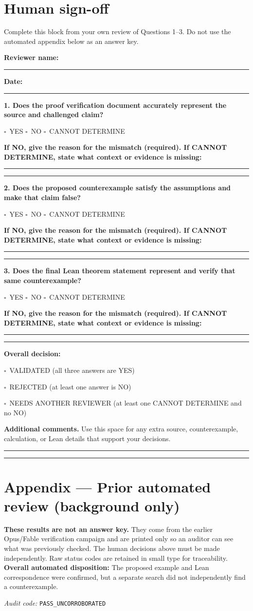 \documentclass[11pt]{article}
\newcommand{\checkbox}{$\square$}
\newcommand{\answerchoices}{\checkbox\ YES \quad \checkbox\ NO \quad \checkbox\ CANNOT DETERMINE}
\newcommand{\decisionexplanation}{%
  \par\smallskip\textbf{If NO, give the reason for the mismatch (required). If
  CANNOT DETERMINE, state what context or evidence is missing:}\par
  \rule{\linewidth}{0.4pt}\par\vspace{7pt}\rule{\linewidth}{0.4pt}\par}
\begin{document}
\section*{Human sign-off}
Complete this block from your own review of Questions 1--3. Do not use the automated appendix below as an answer key.\par
\textbf{Reviewer name:} \rule{9cm}{0.4pt}\par
\textbf{Date:} \rule{4cm}{0.4pt}\par
\medskip\textbf{1. Does the proof verification document accurately represent the source and challenged claim?}\par
\answerchoices\par
\decisionexplanation
\medskip\textbf{2. Does the proposed counterexample satisfy the assumptions and make that claim false?}\par
\answerchoices\par
\decisionexplanation
\medskip\textbf{3. Does the final Lean theorem statement represent and verify that same counterexample?}\par
\answerchoices\par
\decisionexplanation
\medskip\textbf{Overall decision:}\par
\checkbox\ VALIDATED (all three answers are YES)\par
\checkbox\ REJECTED (at least one answer is NO)\par
\checkbox\ NEEDS ANOTHER REVIEWER (at least one CANNOT DETERMINE and no NO)\par
\medskip\textbf{Additional comments.} Use this space for any extra source, counterexample, calculation, or Lean details that support your decisions.\par\rule{\linewidth}{0.4pt}\par\vspace{7pt}\rule{\linewidth}{0.4pt}
\clearpage
\section*{Appendix --- Prior automated review (background only)}
\textbf{These results are not an answer key.} They come from the earlier Opus/Fable verification campaign and are printed only so an auditor can see what was previously checked. The human decisions above must be made independently. Raw status codes are retained in small type for traceability.
\textbf{Overall automated disposition:} The proposed example and Lean correspondence were confirmed, but a separate search did not independently find a counterexample.
\par\textit{Audit code:} \nolinkurl{PASS_UNCORROBORATED}
\end{document}
